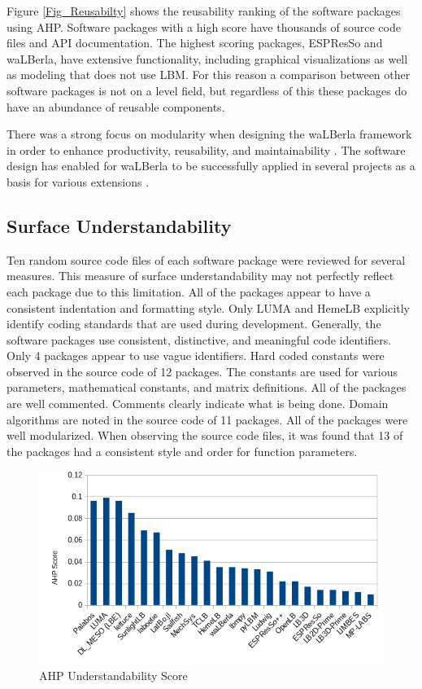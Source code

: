 \documentclass[12pt, notitlepage]{article}
\begin{document}
Figure \ref{Fig_Reusabilty} shows the reusability ranking of the software packages using AHP. Software packages with a high score have thousands of source code files and API documentation. The highest scoring packages, ESPResSo and waLBerla, have extensive functionality, including graphical visualizations as well as modeling that does not use LBM. For this reason a comparison between other software packages is not on a level field, but regardless of this these packages do have an abundance of reusable components. 

There was a strong focus on modularity when designing the waLBerla framework in order to enhance productivity, reusability, and maintainability \citep{bauer2021walberla}. The software design has enabled for waLBerla to be successfully applied in several projects as a basis for various extensions \citep{bauer2021walberla}.

\subsection{Surface Understandability}

Ten random source code files of each software package were reviewed for several measures. This measure of surface understandability may not perfectly reflect each package due to this limitation. All of the packages appear to have a consistent indentation and formatting style. Only LUMA and HemeLB explicitly identify coding standards that are used during development. Generally, the software packages use consistent, distinctive, and meaningful code identifiers. Only 4 packages appear to use vague identifiers. Hard coded constants were observed in the source code of 12 packages. The constants are used for various parameters, mathematical constants, and matrix definitions. All of the packages are well commented. Comments clearly indicate what is being done. Domain algorithms are noted in the source code of 11 packages. All of the packages were well modularized. When observing the source code files, it was found that 13 of the packages had a consistent style and order for function parameters.

\begin{figure}[h!]
	\begin{center}
		\includegraphics[width=1.0\textwidth]{understandability_chart}
		\caption{AHP Understandability Score}
		\label{Fig_Understandability}
	\end{center}
\end{figure}
\end{document}
